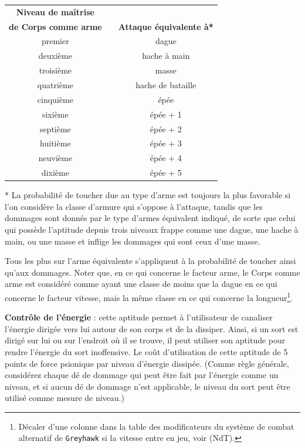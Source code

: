 {{\parindent2cm\begin{tabular}{cp{2.5cm}c}
\textbf{Niveau de maîtrise} && \\
\textbf{de Corps comme arme} && \textbf{Attaque équivalente à*} \\
premier     && dague \\
deuxième    && hache à main \\
troisième   && masse \\
quatrième   && hache de bataille \\
cinquième   && épée \\
sixième     && épée + 1 \\
septième    && épée + 2 \\
huitième    && épée + 3 \\
neuvième    && épée + 4 \\
dixième     && épée + 5 \\
\end{tabular}}

\bigskip

* La probabilité de toucher due au type d'arme est toujours la plus favorable si l'on considère la classe d'armure qui s'oppose à l'attaque, tandis que les dommages sont donnés par le type d'armes équivalent indiqué, de sorte que celui qui possède l'aptitude depuis trois niveaux frappe comme une dague, une hache à main, ou une masse et inflige les dommages qui sont ceux d'une masse.

\bigskip

Tous les plus sur l'arme équivalente s'appliquent à la probabilité de toucher ainsi qu'aux dommages. Noter que, en ce qui concerne le facteur arme, le Corps comme arme est considéré comme ayant une classe de moins que la dague en ce qui concerne le facteur vitesse, mais la même classe en ce qui concerne la longueur\footnote{Décaler d'une colonne dans la table des modificateurs du système de combat alternatif de \texttt{Greyhawk} si la vitesse entre en jeu, voir \pageref{combat-alternatif} (NdT).}.

\bigskip

\textbf{Contrôle de l'énergie} : cette aptitude permet à l'utilisateur de canaliser l'énergie dirigée vers lui autour de son corps et de la dissiper. Ainsi, si un sort est dirigé sur lui ou sur l'endroit où il se trouve, il peut utiliser son aptitude pour rendre l'énergie du sort inoffensive. Le coût d'utilisation de cette aptitude de 5 points de force psionique par niveau d'énergie dissipée. (Comme règle générale, considérez chaque dé de dommage qui peut être fait par l'énergie comme un niveau, et si aucun dé de dommage n'est applicable, le niveau du sort peut être utilisé comme mesure de niveau.)

}
